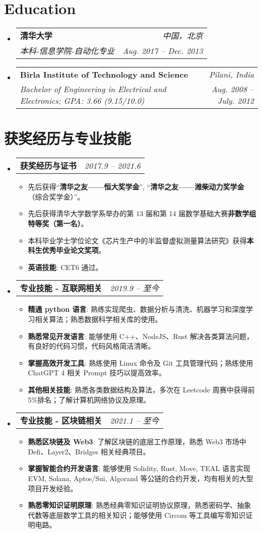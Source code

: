 \documentclass[letterpaper,11pt]{article}
\makeatletter
\newcommand{\resumeItem}[2]{
  \item\small{
    \textbf{#1}{: #2 \vspace{-2pt}}
  }
}
\newcommand{\resumeItemWithoutColon}[1]{
  \item\small{
    {#1 \vspace{-2pt}}
  }
}
\newcommand{\resumeSubheading}[4]{
  \vspace{0pt}\item
    \begin{tabular*}{0.97\textwidth}[t]{l@{\extracolsep{\fill}}r}
      \textbf{#1} & \textit{\small#2} \\
      \textit{\small#3} & \textit{\small #4} \\
    \end{tabular*}\vspace{-5pt}
}
\newcommand{\resumeSubheadingTwo}[2]{
  \vspace{0pt}\item
    \begin{tabular*}{0.97\textwidth}[t]{l@{\extracolsep{\fill}}r}
      \textbf{#1} & \textit{\small#2} \\
    \end{tabular*}\vspace{-5pt}
}
\newcommand{\resumeSubHeadingListStart}{\begin{itemize}[leftmargin=*]}
\newcommand{\resumeSubHeadingListEnd}{\end{itemize}}
\newcommand{\resumeItemListStart}{\begin{itemize}[leftmargin=*]}
\newcommand{\resumeItemListEnd}{\end{itemize}\vspace{-5pt}}
\newif\ifchinese
\makeatother
\begin{document}
\section{Education}
  \resumeSubHeadingListStart
    \resumeSubheading
      {清华大学}{中国，北京}
      {本科-信息学院-自动化专业}{Aug. 2017 -- Dec. 2013}
    \resumeSubheading
      {Birla Institute of Technology and Science}{Pilani, India}
      {Bachelor of Engineering in Electrical and Electronics;  GPA: 3.66 (9.15/10.0)}{Aug. 2008 -- July. 2012}
  \resumeSubHeadingListEnd
\fi



\ifchinese
\section{获奖经历与专业技能}
 \resumeSubHeadingListStart
   \resumeSubheadingTwo
    {获奖经历与证书}{2017.9 -- 2021.6}
      \resumeItemListStart
        \resumeItemWithoutColon{先后获得“\textbf{清华之友——恒大奖学金}”, “\textbf{清华之友——潍柴动力奖学金}（综合奖学金）”。}
        \resumeItemWithoutColon{先后获得清华大学数学系举办的第 13 届和第 14 届数学基础大赛\textbf{非数学组特等奖（第一名）}。}
        \resumeItemWithoutColon{本科毕业学士学位论文《芯片生产中的半监督虚拟测量算法研究》获得\textbf{本科生优秀毕业论文奖项}。}
        \resumeItem{英语技能}{CET6 通过。}
      \resumeItemListEnd
   \resumeSubheadingTwo
    {专业技能 - 互联网相关}{2019.9 -- 至今}
      \resumeItemListStart
        \resumeItem{精通 python 语言}{熟练实现爬虫、数据分析与清洗、机器学习和深度学习相关算法；熟悉数据科学相关库的使用。}
        \resumeItem{熟悉常见开发语言}{能够使用 C++、NodeJS、Rust 解决各类算法问题，有良好的代码习惯，代码风格简洁清晰。}
        \resumeItem{掌握高效开发工具}{熟练使用 Linux 命令及 Git 工具管理代码；熟练使用 ChatGPT 4 相关 Prompt 技巧以提高效率。 }
        \resumeItem{其他相关技能}{熟悉各类数据结构及算法，多次在 Leetcode 周赛中获得前 5\%排名；了解计算机网络协议及原理。}
      \resumeItemListEnd
   \resumeSubheadingTwo
    {专业技能 - 区块链相关}{2021.1 -- 至今}
      \resumeItemListStart
        \resumeItem{熟悉区块链及 Web3}{了解区块链的底层工作原理，熟悉 Web3 市场中 Defi、Layer2、Bridges 相关经典项目。}
        \resumeItem{掌握智能合约开发语言}{能够使用 Solidity, Rust, Move, TEAL 语言实现 EVM, Solana, Aptos/Sui, Algorand 等公链的合约开发，均有相关的大型项目开发经验。 }
        \resumeItem{熟悉零知识证明原理}{熟悉经典零知识证明协议原理，熟悉密码学、抽象代数等底层数学工具的相关知识；能够使用 Circom 等工具编写零知识证明电路。}
      \resumeItemListEnd
 \resumeSubHeadingListEnd
\else
\end{document}
